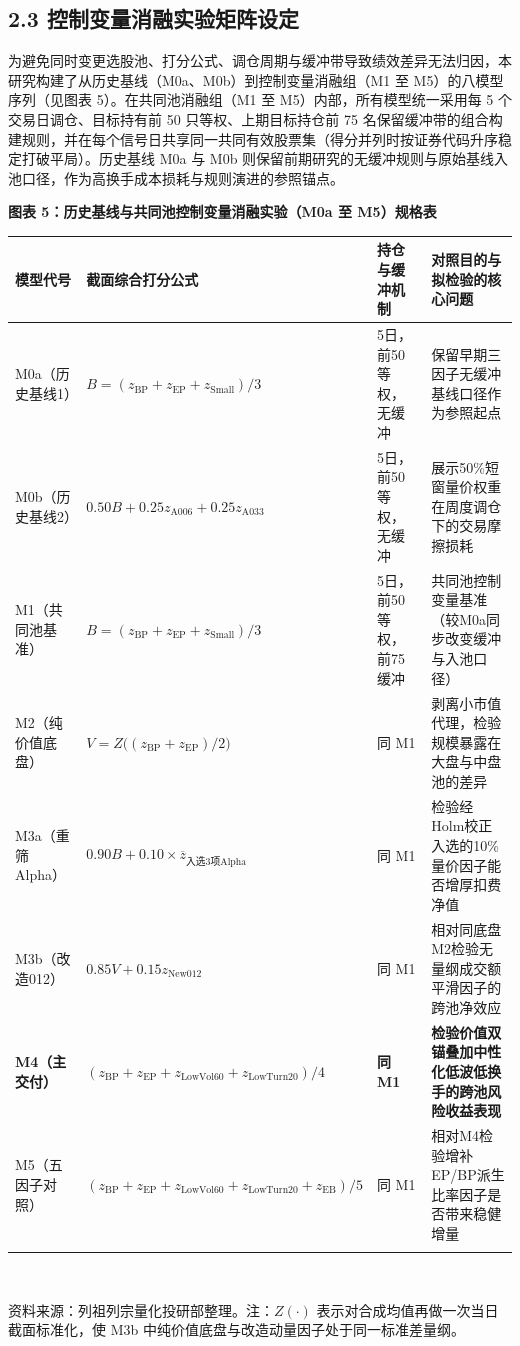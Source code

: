\documentclass[12pt,a4paper]{article}
\let\origsubsection\subsection
\renewcommand{\subsection}[1]{\needspace{4\baselineskip}\origsubsection{#1}}
\newcommand{\exhibitcap}[1]{{\sffamily\bfseries\fontsize{9.6pt}{12.5pt}\selectfont\textcolor{Primary}{#1}}\\[2pt]}
\newcommand{\exhibitnote}[1]{{\fontsize{7.5pt}{10pt}\selectfont\color{GrayNote}#1\par}}
\begin{document}
\subsection{2.3 控制变量消融实验矩阵设定}

为避免同时变更选股池、打分公式、调仓周期与缓冲带导致绩效差异无法归因，本研究构建了从历史基线（M0a、M0b）到控制变量消融组（M1 至 M5）的八模型序列（见图表 5）。在共同池消融组（M1 至 M5）内部，所有模型统一采用每 5 个交易日调仓、目标持有前 50 只等权、上期目标持仓前 75 名保留缓冲带的组合构建规则，并在每个信号日共享同一共同有效股票集（得分并列时按证券代码升序稳定打破平局）。历史基线 M0a 与 M0b 则保留前期研究的无缓冲规则与原始基线入池口径，作为高换手成本损耗与规则演进的参照锚点。

\vspace{4pt}
\noindent\begin{minipage}{\textwidth}
\setlength{\parindent}{0pt}\setlength{\tabcolsep}{3.8pt}
\exhibitcap{图表 5：历史基线与共同池控制变量消融实验（M0a 至 M5）规格表}
\fontsize{7.8pt}{10.6pt}\selectfont
\begin{tabularx}{\textwidth}{@{}l l l X@{}}
  \arrayrulecolor{Primary}\toprule[1.0pt]
  \rowcolor{TblHdr}
  \textbf{\sffamily 模型代号} & \textbf{\sffamily 截面综合打分公式} & \textbf{\sffamily 持仓与缓冲机制} & \textbf{\sffamily 对照目的与拟检验的核心问题} \\
  \midrule[0.5pt]
  M0a（历史基线1） & $B = (z_{\text{BP}} + z_{\text{EP}} + z_{\text{Small}})/3$ & 5日，前50等权，无缓冲 & 保留早期三因子无缓冲基线口径作为参照起点 \\
  M0b（历史基线2） & $0.50 B + 0.25 z_{\text{A006}} + 0.25 z_{\text{A033}}$ & 5日，前50等权，无缓冲 & 展示50\%短窗量价权重在周度调仓下的交易摩擦损耗 \\
  M1（共同池基准） & $B = (z_{\text{BP}} + z_{\text{EP}} + z_{\text{Small}})/3$ & 5日，前50等权，前75缓冲 & 共同池控制变量基准（较M0a同步改变缓冲与入池口径） \\
  M2（纯价值底盘） & $V = Z\big((z_{\text{BP}} + z_{\text{EP}})/2\big)$ & 同 M1 & 剥离小市值代理，检验规模暴露在大盘与中盘池的差异 \\
  M3a（重筛Alpha） & $0.90 B + 0.10 \times \overline{z}_{\text{入选3项Alpha}}$ & 同 M1 & 检验经Holm校正入选的10\%量价因子能否增厚扣费净值 \\
  M3b（改造012） & $0.85 V + 0.15 z_{\text{New012}}$ & 同 M1 & 相对同底盘M2检验无量纲成交额平滑因子的跨池净效应 \\
  \textbf{\textcolor{Primary}{M4（主交付）}} & \textbf{\textcolor{Primary}{$(z_{\text{BP}} + z_{\text{EP}} + z_{\text{LowVol60}} + z_{\text{LowTurn20}})/4$}} & \textbf{同 M1} & \textbf{检验价值双锚叠加中性化低波低换手的跨池风险收益表现} \\
  M5（五因子对照） & $(z_{\text{BP}} + z_{\text{EP}} + z_{\text{LowVol60}} + z_{\text{LowTurn20}} + z_{\text{EB}})/5$ & 同 M1 & 相对M4检验增补EP/BP派生比率因子是否带来稳健增量 \\
  \arrayrulecolor{Primary}\bottomrule[1.0pt]
\end{tabularx}\\[3pt]
\exhibitnote{资料来源：列祖列宗量化投研部整理。注：$Z(\cdot)$ 表示对合成均值再做一次当日截面标准化，使 M3b 中纯价值底盘与改造动量因子处于同一标准差量纲。}
\end{minipage}
\end{document}
